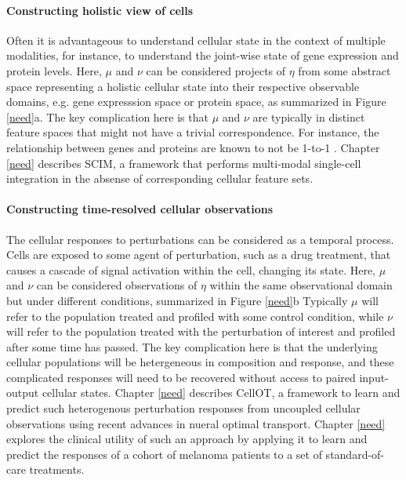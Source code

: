 
\paragraph{Constructing holistic view of cells}
Often it is advantageous to understand cellular state in the context of multiple modalities,
for instance, to understand the joint-wise state of gene expression and protein levels.
Here, $\mu$ and $\nu$ can be considered projects of $\eta$ from some abstract space representing a holistic cellular state into their respective observable domains, e.g. gene expresssion space or protein space, as summarized in Figure \ref{need}a.
The key complication here is that $\mu$ and $\nu$ are typically in distinct feature spaces that might not have a trivial correspondence.
For instance, the relationship between genes and proteins are known to not be 1-to-1 \cite{need}.
Chapter \ref{need} describes SCIM, a framework that performs multi-modal single-cell integration in the absense of corresponding cellular feature sets.

\paragraph{Constructing time-resolved cellular observations}
The cellular responses to perturbations can be considered as a temporal process.
Cells are exposed to some agent of perturbation, such as a drug treatment, that causes a cascade of signal activation within the cell, changing its state.
Here, $\mu$ and $\nu$ can be considered observations of $\eta$ within the same observational domain but under different conditions, summarized in Figure \ref{need}b
Typically $\mu$ will refer to the population treated and profiled with some control condition, while $\nu$ will refer to the population treated with the perturbation of interest and profiled after some time has passed.
The key complication here is that the underlying cellular populations will be hetergeneous in composition and response, and these complicated responses will need to be recovered without access to paired input-output cellular states.
Chapter \ref{need} describes CellOT, a framework to learn and predict such heterogenous perturbation responses from uncoupled cellular observations using recent advances in nueral optimal transport.
Chapter \ref{need} explores the clinical utility of such an approach by applying it to learn and predict the responses of a cohort of melanoma patients to a set of standard-of-care treatments.
